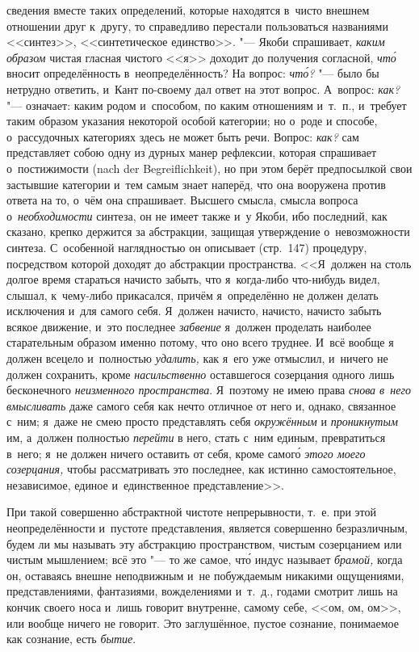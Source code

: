 сведения вместе таких определений, которые находятся в~чисто внешнем отношении
друг к~другу, то справедливо перестали пользоваться названиями <<синтез>>,
<<синтетическое единство>>. "--- Якоби спрашивает, {\em каким образом}
чистая гласная чистого <<я>> доходит до получения согласной, {\em чт\'{о}}
вносит определённость в~неопределённость? На вопрос: {\em чт\'{о}?} "--- было бы
нетрудно ответить, и~Кант по-своему дал ответ на этот вопрос. А~вопрос:
{\em как?} "--- означает: каким родом и~способом, по каким отношениям и~т.~п.,
и~требует таким образом указания некоторой особой категории; но о~роде и
способе, о~рассудочных категориях здесь не может быть речи. Вопрос: {\em как?}
сам представляет собою одну из дурных манер рефлексии, которая спрашивает
о~постижимости (nach der Begrei\-flich\-keit), но при этом берёт предпосылкой
свои застывшие категории и~тем самым знает наперёд, что она вооружена против
ответа на то, о~чём она спрашивает. Высшего смысла, смысла вопроса
о~{\em необходимости} синтеза, он не имеет также и~у Якоби, ибо последний, как
сказано, крепко держится за абстракции, защищая утверждение о~невозможности
синтеза. С~особенной наглядностью он описывает (стр.~147) процедуру,
посредством которой доходят до абстракции пространства. <<Я~должен на столь
долгое время стараться начисто забыть, что я~когда-либо что-нибудь видел,
слышал, к~чему-либо прикасался, причём я~определённо не должен делать
исключения и~для самого себя. Я~должен начисто, начисто, начисто забыть всякое
движение, и~это последнее {\em забвение} я~должен проделать наиболее
старательным образом именно потому, что оно всего труднее. И~всё вообще я
должен всецело и~полностью {\em удалить,} как я~его уже отмыслил, и~ничего не
должен сохранить, кроме {\em насильственно} оставшегося созерцания одного лишь
бесконечного {\em неизменного пространства}. Я~поэтому не имею права
{\em снова в~него вмысливать} даже самого себя как нечто отличное от него и,
однако, связанное с~ним; я~даже не смею просто представлять себя
{\em окружённым} и {\em проникнутым} им, а~должен полностью {\em перейти} в
него, стать с~ним единым, превратиться в~него; я~не должен ничего оставить от
себя, кроме самог\'{о} {\em этого моего созерцания,} чтобы рассматривать это
последнее, как истинно самостоятельное, независимое, единое и~единственное
представление>>.

При такой совершенно абстрактной чистоте непрерывности, т.~е. при этой
неопределённости и~пустоте представления, является совершенно безразличным,
будем ли мы называть эту абстракцию пространством, чистым созерцанием или
чистым мышлением; всё это "--- то же самое, чт\'{о} индус называет
{\em брамой,} когда он, оставаясь внешне неподвижным и~не побуждаемым
никакими ощущениями, представлениями, фантазиями, вожделениями и~т.~д.,
годами смотрит лишь на кончик своего носа и~лишь говорит внутренне, самому
себе, <<ом, ом, ом>>, или вообще ничего не говорит. Это заглушённое, пустое
сознание, понимаемое как сознание, есть {\em бытие}.

